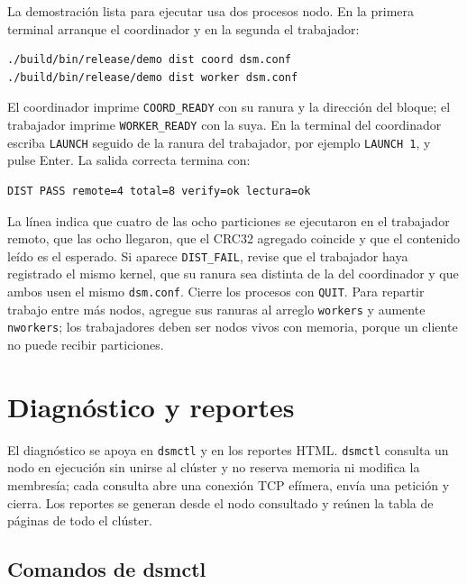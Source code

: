 La demostración lista para ejecutar usa dos procesos nodo. En la primera terminal arranque el coordinador y en la segunda el trabajador:

\begin{lstlisting}
./build/bin/release/demo dist coord dsm.conf
./build/bin/release/demo dist worker dsm.conf
\end{lstlisting}

El coordinador imprime \texttt{COORD\_READY} con su ranura y la dirección del bloque; el trabajador imprime \texttt{WORKER\_READY} con la suya. En la terminal del coordinador escriba \texttt{LAUNCH} seguido de la ranura del trabajador, por ejemplo \texttt{LAUNCH 1}, y pulse Enter. La salida correcta termina con:

\begin{lstlisting}
DIST PASS remote=4 total=8 verify=ok lectura=ok
\end{lstlisting}

La línea indica que cuatro de las ocho particiones se ejecutaron en el trabajador remoto, que las ocho llegaron, que el CRC32 agregado coincide y que el contenido leído es el esperado. Si aparece \texttt{DIST\_FAIL}, revise que el trabajador haya registrado el mismo kernel, que su ranura sea distinta de la del coordinador y que ambos usen el mismo \texttt{dsm.conf}. Cierre los procesos con \texttt{QUIT}. Para repartir trabajo entre más nodos, agregue sus ranuras al arreglo \texttt{workers} y aumente \texttt{nworkers}; los trabajadores deben ser nodos vivos con memoria, porque un cliente no puede recibir particiones.

\section{Diagnóstico y reportes}\label{sec:diagnostico}

El diagnóstico se apoya en \texttt{dsmctl} y en los reportes HTML. \texttt{dsmctl} consulta un nodo en ejecución sin unirse al clúster y no reserva memoria ni modifica la membresía; cada consulta abre una conexión TCP efímera, envía una petición y cierra. Los reportes se generan desde el nodo consultado y reúnen la tabla de páginas de todo el clúster.

\subsection{Comandos de dsmctl}\label{subsec:comandos-dsmctl}

